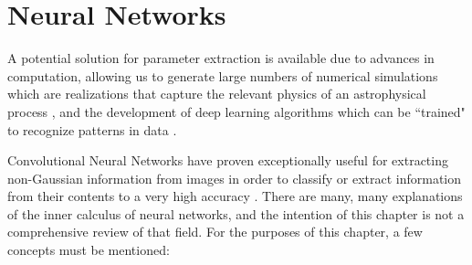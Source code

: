 \section{Neural Networks}

A potential solution for parameter extraction is available due to advances in computation, allowing us to generate large numbers of numerical simulations which are realizations that capture the relevant physics of an astrophysical process \citep[e.g.][]{Mesinger.11}, and the development of deep learning algorithms which can be ``trained" to recognize patterns in data \citep[e.g.][]{Hinton.06, Hinton.12}.

Convolutional Neural Networks \citep[CNNs; e.g.][]{Lecun.95} have proven exceptionally useful for extracting non-Gaussian information from images in order to classify or extract information from their contents to a very high accuracy \citep[e.g.][]{imagenet.12}. There are many, many explanations of the inner calculus of neural networks, and the intention of this chapter is not a comprehensive review of that field. For the purposes of this chapter, a few concepts must be mentioned:

